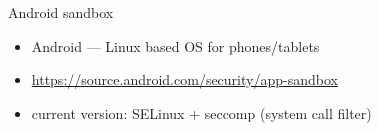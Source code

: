 \begin{frame}{Android sandbox}
    \begin{itemize}
    \item Android --- Linux based OS for phones/tablets
    \vspace{.5cm}
    \item \url{https://source.android.com/security/app-sandbox}
    \item current version: SELinux + seccomp (system call filter)
    \end{itemize}
\end{frame}

